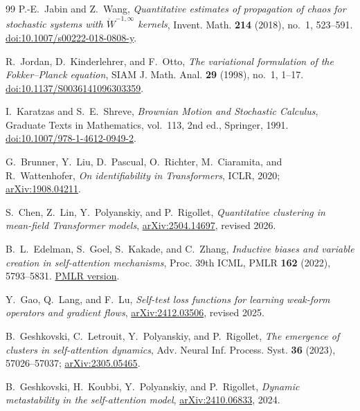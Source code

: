 \documentclass[11pt]{amsart}
\numberwithin{equation}{section}
\theoremstyle{plain}
\begin{document}
\begin{thebibliography}{99}
P.-E.~Jabin and Z.~Wang,
\emph{Quantitative estimates of propagation of chaos for stochastic systems
with $\dot W^{-1,\infty}$ kernels},
Invent. Math. \textbf{214} (2018), no.~1, 523--591.
\href{https://doi.org/10.1007/s00222-018-0808-y}
{doi:10.1007/s00222-018-0808-y}.

R.~Jordan, D.~Kinderlehrer, and F.~Otto,
\emph{The variational formulation of the Fokker--Planck equation},
SIAM J. Math. Anal. \textbf{29} (1998), no.~1, 1--17.
\href{https://doi.org/10.1137/S0036141096303359}
{doi:10.1137/S0036141096303359}.

I.~Karatzas and S.~E.~Shreve,
\emph{Brownian Motion and Stochastic Calculus},
Graduate Texts in Mathematics, vol.~113, 2nd ed., Springer, 1991.
\href{https://doi.org/10.1007/978-1-4612-0949-2}
{doi:10.1007/978-1-4612-0949-2}.

G.~Brunner, Y.~Liu, D.~Pascual, O.~Richter, M.~Ciaramita, and R.~Wattenhofer,
\emph{On identifiability in Transformers},
ICLR, 2020;
\href{https://arxiv.org/abs/1908.04211}{arXiv:1908.04211}.

S.~Chen, Z.~Lin, Y.~Polyanskiy, and P.~Rigollet,
\emph{Quantitative clustering in mean-field Transformer models},
\href{https://arxiv.org/abs/2504.14697}{arXiv:2504.14697}, revised 2026.

B.~L.~Edelman, S.~Goel, S.~Kakade, and C.~Zhang,
\emph{Inductive biases and variable creation in self-attention mechanisms},
Proc. 39th ICML, PMLR \textbf{162} (2022), 5793--5831.
\href{https://proceedings.mlr.press/v162/edelman22a.html}{PMLR version}.

Y.~Gao, Q.~Lang, and F.~Lu,
\emph{Self-test loss functions for learning weak-form operators and gradient
flows},
\href{https://arxiv.org/abs/2412.03506}{arXiv:2412.03506}, revised 2025.

B.~Geshkovski, C.~Letrouit, Y.~Polyanskiy, and P.~Rigollet,
\emph{The emergence of clusters in self-attention dynamics},
Adv. Neural Inf. Process. Syst. \textbf{36} (2023), 57026--57037;
\href{https://arxiv.org/abs/2305.05465}{arXiv:2305.05465}.

B.~Geshkovski, H.~Koubbi, Y.~Polyanskiy, and P.~Rigollet,
\emph{Dynamic metastability in the self-attention model},
\href{https://arxiv.org/abs/2410.06833}{arXiv:2410.06833}, 2024.


\end{thebibliography}
\end{document}
